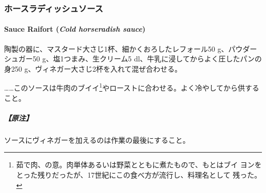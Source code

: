 \begin{recette}
{\subsubsection{ホースラディッシュソース}\label{ux30dbux30fcux30b9ux30e9ux30c7ux30a3ux30c3ux30b7ux30e5ux30bdux30fcux30b9}}

\hypertarget{cold-horseradish-sauce}{%
\paragraph{\texorpdfstring{Sauce Raifort (\emph{Cold horseradish
sauce})}{Sauce Raifort (Cold horseradish sauce)}}\label{cold-horseradish-sauce}}


陶製の器に、マスタード大さじ1杯、細かくおろしたレフォール50
g、パウダーシュガー50 g、塩1つまみ、生クリーム5
dl、牛乳に浸してからよく圧したパンの身250
g、ヴィネガー大さじ2杯を入れて混ぜ合わせる。

\ldots{}\ldots{}このソースは牛肉のブイイ\footnote{茹で肉、の意。肉単体あるいは野菜とともに煮たもので、もとはブイ
  ヨンをとった残りだったが、17世紀にこの食べ方が流行し、料理名として
  残った。}やローストに合わせる。よく冷やしてから供すること。

\hypertarget{ux539fux6ce8-6}{%
\subparagraph{【原注】}\label{ux539fux6ce8-6}}

ソースにヴィネガーを加えるのは作業の最後にすること。
\end{recette}